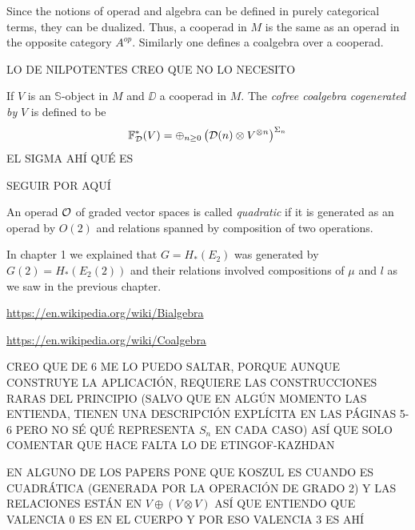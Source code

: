 \documentclass[TFM.tex]{subfiles}
\begin{document}
Since the notions of operad and algebra can be defined in purely categorical terms, they can be dualized. Thus, a cooperad in $M$ is
the same as an operad in the opposite category $A^{op}$. Similarly one defines a coalgebra over a cooperad.

LO DE NILPOTENTES CREO QUE NO LO NECESITO

\begin{defi}
If $V$ is an $\mathbb{S}$-object in $M$ and $\DD$ a cooperad in $M$. The \emph{cofree coalgebra cogenerated by }$V$ is defined to be
\[
\mathbb{F}^*_{\mathcal{D}}(V)=\oplus_{n\geq 0}\left(\mathcal{D}(n)\otimes V^{\otimes n}\right)^{\Sigma_n}
\]
EL SIGMA AHÍ QUÉ ES
\end{defi}
SEGUIR POR AQUÍ
\begin{defi}
An operad ${\mathcal O}$ of graded vector spaces is called \emph{quadratic} if it is generated as an operad by $O(2)$ and relations spanned by composition of two operations. 
\end{defi}

In chapter 1 we explained that $G=H_*(E_2)$ was generated by $G(2)=H_*(E_2(2))$ and their relations involved compositions of $\mu$ and $l$ as we saw in the previous chapter. %


\url{https://en.wikipedia.org/wiki/Bialgebra}

\url{https://en.wikipedia.org/wiki/Coalgebra}


CREO QUE DE 6 ME LO PUEDO SALTAR, PORQUE AUNQUE CONSTRUYE LA APLICACIÓN, REQUIERE LAS CONSTRUCCIONES RARAS DEL PRINCIPIO (SALVO QUE EN ALGÚN MOMENTO LAS ENTIENDA, TIENEN UNA DESCRIPCIÓN EXPLÍCITA EN LAS PÁGINAS 5-6 PERO NO SÉ QUÉ REPRESENTA $S_n$ EN CADA CASO) ASÍ QUE SOLO COMENTAR QUE HACE FALTA LO DE ETINGOF-KAZHDAN


EN ALGUNO DE LOS PAPERS PONE QUE KOSZUL ES CUANDO ES CUADRÁTICA (GENERADA POR LA OPERACIÓN DE GRADO 2) Y LAS RELACIONES ESTÁN EN $V\oplus (V\otimes V)$ ASÍ QUE ENTIENDO QUE VALENCIA 0 ES EN EL CUERPO Y POR ESO VALENCIA 3 ES AHÍ

\end{document}
